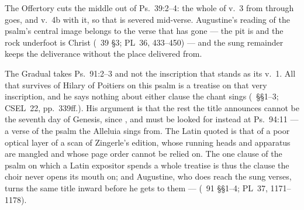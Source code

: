 The Offertory cuts the middle out of Ps.\ 39:2--4: the whole of v.~3 from
 through 
goes, and v.~4b with it, so that  is severed
mid-verse. Augustine's reading of the psalm's central image belongs to the
verse that has gone --- the pit is  and the rock underfoot is Christ (~39
§3; PL~36, 433--450) --- and the sung remainder keeps the deliverance without
the place delivered from.

The Gradual takes Ps.\ 91:2--3 and not the inscription  that stands as its v.~1. All that survives of Hilary of
Poitiers on this psalm is a treatise on that very inscription, and he says
nothing about either clause the chant sings (~§§1--3;
CSEL~22, pp.~339ff.). His argument is that the rest the title announces cannot
be the seventh day of Genesis, since , and must be looked for instead at
Ps.\ 94:11 --- a verse of the psalm the Alleluia sings from. The Latin quoted is
that of a poor optical layer of a scan of Zingerle's edition, whose running
heads and apparatus are mangled and whose page order cannot be relied on. The
one clause of the psalm on which a Latin expositor spends a whole treatise is
thus the clause the choir never opens its mouth on; and Augustine, who does
reach the sung verses, turns the same title inward before he gets to them ---
 (~91 §§1--4;
PL~37, 1171--1178).

